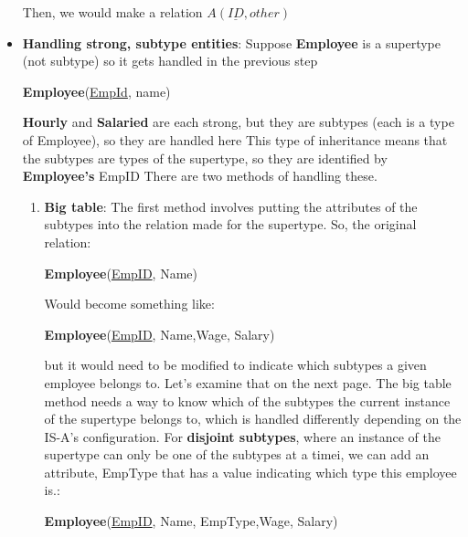 \documentclass{report}
\begin{document}
\begin{itemize}
            \bigbreak \noindent 
            Then, we would make a relation $A(\underline{ID}, other)$
        \item \textbf{Handling strong, subtype entities}: Suppose
            \bigbreak \noindent 
            \bigbreak \noindent 
            \textbf{Employee} is a supertype (not subtype) so it gets handled in the previous step
            \begin{center}
                \textbf{Employee}(\underline{EmpId}, name)
            \end{center}
            \bigbreak \noindent 
            \textbf{Hourly} and \textbf{Salaried} are each strong, but they are subtypes (each is a type of Employee), so they are handled here
            \bigbreak \noindent 
            This type of inheritance means that the subtypes are types of the supertype, so they are identified by \textbf{Employee's} EmpID
            \bigbreak \noindent 
            There are two methods of handling these.
            \begin{enumerate}
                \item \textbf{Big table}: The first method involves putting the attributes of the subtypes into the relation made for the supertype. So, the original relation:
                    \begin{center}
                        \textbf{Employee}(\underline{EmpID}, Name)
                    \end{center}
                    Would become something like:
                    \begin{center}
                        \textbf{Employee}(\underline{EmpID}, Name,Wage, Salary)
                    \end{center}
                    but it would need to be modified to indicate which subtypes a given employee belongs to. Let's examine that on the next page.
                    \bigbreak \noindent 
                    The big table method needs a way to know which of the subtypes the current instance of the supertype belongs to, which is handled differently depending on the IS-A's configuration.
                    \bigbreak \noindent 
                    For \textbf{disjoint subtypes}, where an instance of the supertype can only be one of the subtypes at a timei, we can add an attribute, EmpType that has a value indicating which type this employee is.:
                    \begin{center}
                        \textbf{Employee}(\underline{EmpID}, Name, EmpType,Wage, Salary)

\end{center}
\end{enumerate}
\end{itemize}
\end{document}

